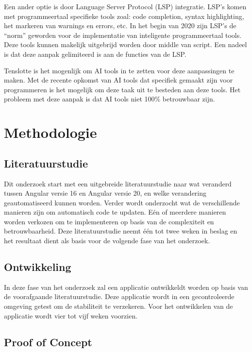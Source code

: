 Een ander optie is door Language Server Protocol (LSP) integratie.
LSP's komen met programmeertaal specifieke tools zoal: code completion, syntax highlighting, het markeren van warnings en errors, etc.
In het begin van 2020 zijn LSP's de ``norm'' geworden voor de implementatie van inteligente programmeertaal tools.
Deze tools kunnen makelijk uitgebrijd worden door middle van script.
Een nadeel is dat deze aanpak gelimiteerd is aan de functies van de LSP.

Tenslotte is het mogenlijk om AI tools in te zetten voor deze aanpassingen te maken.
Met de recente opkomst van AI tools dat specifiek gemaakt zijn voor programmeren is het mogelijk om deze taak uit te besteden aan deze tools.
Het probleem met deze aanpak is dat AI tools niet 100\% betrouwbaar zijn.

\section{Methodologie}
\label{sec:methodologie}

\subsection{Literatuurstudie}

Dit onderzoek start met een uitgebreide literatuurstudie naar wat veranderd tussen Angular versie 16 en Angular versie 20, en welke verandering geautomatiseerd kunnen worden.
Verder wordt onderzocht wat de verschillende manieren zijn om automatisch code te updaten.
Eén of meerdere manieren worden verkozen om te implementeren op basis van de complexiteit en betrouwbaarheid.
Deze literatuurstudie neemt één tot twee weken in beslag en het resultaat dient als basis voor de volgende fase van het onderzoek.

\subsection{Ontwikkeling}

In deze fase van het onderzoek zal een applicatie ontwikkeldt worden op basis van de voorafgaande literatuurstudie.
Deze applicatie wordt in een gecontroleerde omgeving getest om de stabiliteit te verzekeren.
Voor het ontwikkelen van de applicatie wordt vier tot vijf weken voorzien.

\subsection{Proof of Concept}

